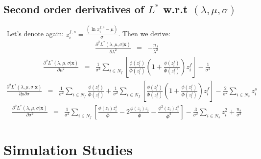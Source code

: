 \documentclass{article}
\begin{document}
\subsection{Second order derivatives of $L^*$ w.r.t $\left(\lambda, \mu, \sigma \right)$}\
\indent Let's denote again: $z_i^{f,s} = \frac{\left(\ln x_i^{f,s} - \mu \right)}{\sigma}$. Then we derive: 
\begin{eqnarray}
\frac{\partial^2 L^*(\lambda, \mu, \sigma | \textbf{x}) }{\partial \lambda^2} &=& - \frac{n_f}{\lambda ^ 2} 
\end{eqnarray} 
\begin{eqnarray}
\frac{\partial^2 L^*(\lambda, \mu, \sigma | \textbf{x}) }{\partial \mu^2} &=& \frac{1}{\sigma^2}\sum_{i \in N_f} \left[ \frac{\phi \left( z_i^f \right)}{\overline \Phi \left( z_i^f \right)}\left( 1 + \frac{\phi \left( z_i^f \right)}{\overline \Phi \left( z_i^f \right)} \right) z_i^f \right] - \frac{1}{\sigma^2} 
\end{eqnarray} 
\begin{eqnarray}
\frac{\partial^2 L^*(\lambda, \mu, \sigma | \textbf{x}) }{\partial \mu \partial\sigma} &=& \frac{1}{\sigma^2} \sum_{i \in N_f} \frac{\phi \left( z_i^f \right)}{\overline \Phi \left( z_i^f \right)} + \frac{1}{\sigma^2}\sum_{i \in N_f} \left[ \frac{\phi \left( z_i^f \right)}{\overline \Phi \left( z_i^f \right)}\left( 1 + \frac{\phi \left( z_i^f \right)}{\overline \Phi \left( z_i^f \right)} \right) z_i^f \right] - \frac{2}{\sigma^2}\sum_{i \in N_s} z_i^s 
\end{eqnarray} 
\begin{eqnarray}
\frac{\partial^2 L^*(\lambda, \mu, \sigma | \textbf{x}) }{\partial \sigma^2} &=& \frac{1}{\sigma^2} \sum_{i \in N_f} \left[ \frac{\phi (z_i) z_i^3}{\overline \Phi} - 2\frac{\phi(z_i)z_i}{\overline \Phi} - \frac{\phi^2(z_i) z_i^2}{\overline\Phi ^2} \right] - \frac{3}{\sigma^2}\sum_{i \in N_s} z_i^2 + \frac{n_s}{\sigma^2}
\end{eqnarray} 
\section{Simulation Studies}
\end{document}

